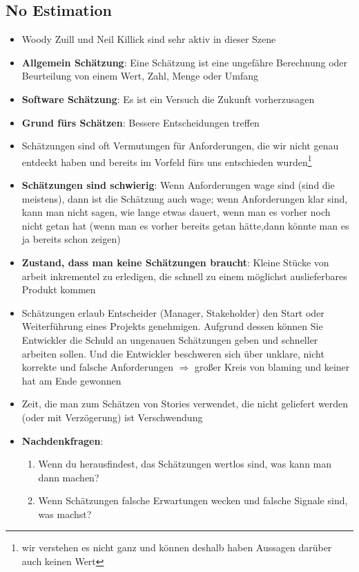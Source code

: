 \subsection{No Estimation}
\begin{itemize}
  \item Woody Zuill und Neil Killick sind sehr aktiv in dieser Szene
  \item \textbf{Allgemein Schätzung}: Eine Schätzung ist eine ungefähre Berechnung oder Beurteilung
    von  einem Wert, Zahl, Menge oder Umfang
  \item \textbf{Software Schätzung}: Es ist ein Versuch die Zukunft vorherzusagen
  \item \textbf{Grund fürs Schätzen}: Bessere Entscheidungen treffen
  \item Schätzungen sind oft Vermutungen für Anforderungen, die wir nicht genau entdeckt
    haben und bereits im Vorfeld fürs uns entschieden wurden\footnote{wir verstehen es nicht ganz
      und können deshalb haben Aussagen darüber auch keinen Wert}
  \item \textbf{Schätzungen sind schwierig}: Wenn Anforderungen wage sind (sind die meistens),
    dann ist die Schätzung auch wage; wenn Anforderungen klar sind, kann man nicht
    sagen, wie lange etwas dauert, wenn man es vorher noch nicht getan hat (wenn man es vorher
    bereits getan hätte,dann könnte man es ja bereits schon zeigen)
  \item \textbf{Zustand, dass man keine Schätzungen braucht}: Kleine Stücke von arbeit
    inkrementel zu erledigen, die schnell zu einem möglichst auslieferbares Produkt
    kommen
  \item Schätzungen erlaub Entscheider (Manager, Stakeholder) den Start oder Weiterführung eines
    Projekts genehmigen. Aufgrund dessen können Sie Entwickler die Schuld an ungenauen Schätzungen
    geben und schneller arbeiten sollen. Und die Entwickler beschweren sich über unklare, nicht korrekte und falsche
    Anforderungen $\Rightarrow$  großer Kreis von blaming und keiner hat am Ende gewonnen
  \item Zeit, die man zum Schätzen von Stories verwendet, die nicht geliefert werden (oder
    mit Verzögerung) ist Verschwendung
  \item \textbf{Nachdenkfragen}:
    \begin{enumerate}
      \item Wenn du herausfindest, das Schätzungen wertlos sind, was kann man dann machen?
      \item Wenn Schätzungen falsche Erwartungen wecken und falsche Signale sind, was machst?

\end{enumerate}
\end{itemize}
